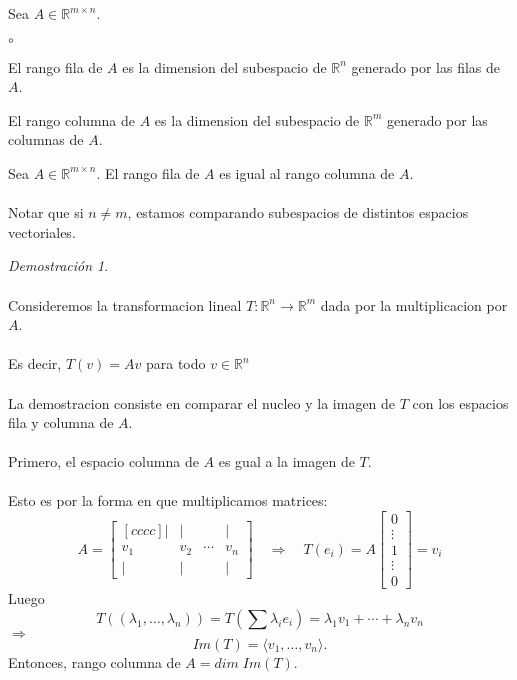 \documentclass{article}
\theoremstyle{definition}
\theoremstyle{definition}
\theoremstyle{remark}
\newtheorem*{demo}{Demostración}
\begin{document}
\begin{defi}
  Sea $A \in \mathbb{R}^{m \times n}$. \begin{list}{$\circ$}{}  
  \item  El rango fila de $A$ es la dimension del subespacio de $\mathbb{R}^n$ generado por las filas de $A$. 
  \item El rango columna de $A$ es la dimension del subespacio de $\mathbb{R}^m$ generado por las columnas de $A$.
\end{list}
\end{defi}
\begin{teo}
  Sea $A \in \mathbb{R}^{m \times n}$. El rango fila de $A$ es igual al rango columna de $A$. \\\\ Notar que si $n \neq m$, estamos comparando subespacios de distintos espacios vectoriales.
\end{teo}
\begin{demo} \; \\\\
  Consideremos la transformacion lineal $T: \mathbb{R}^n \to \mathbb{R}^{m}$ dada por la multiplicacion por $A$. \\\\ Es decir, $T(v)=Av$ para todo $v \in \mathbb{R}^n$ \\\\ La demostracion consiste en comparar el nucleo y la imagen de $T$ con los espacios fila y columna de $A$. \\\\ 
  Primero, el espacio columna de $A$ es gual a la imagen de $T$. \\\\ Esto es por la forma en que multiplicamos matrices: \[
    A=\begin{bmatrix}[cccc]| & | & & | \\ v_1 & v_2 & \cdots & v_n \\ | & | & & | \end{bmatrix} \quad \Rightarrow \quad T(e_i)=A \begin{bmatrix}0 \\ \vdots \\ 1 \\ \vdots \\ 0 \end{bmatrix}=v_i 
  \]
  Luego  \[
    T((\lambda_1, \dots ,\lambda_n))=T\left(\sum \lambda_i e_i\right)=\lambda_1 v_1 + \cdots + \lambda_nv_n
  \]
  $\Rightarrow$ \[
Im(T)=\langle v_1, \dots ,v_n \rangle.
  \]
  Entonces, rango columna de $A = dim \; Im(T)$.
\end{demo} 
\pagebreak
\end{document}
